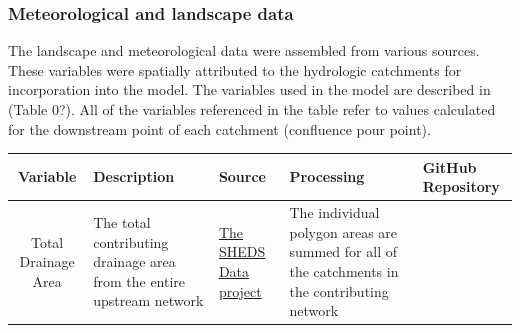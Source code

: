 \documentclass[]{article}
\begin{document}
\subsubsection{Meteorological and landscape
data}\label{meteorological-and-landscape-data}

The landscape and meteorological data were assembled from various
sources. These variables were spatially attributed to the hydrologic
catchments for incorporation into the model. The variables used in the
model are described in (Table 0?). All of the variables referenced in
the table refer to values calculated for the downstream point of each
catchment (confluence pour point).

\begin{longtable}[c]{@{}cllll@{}}
\toprule
\begin{minipage}[b]{0.10\columnwidth}\centering\strut
Variable
\strut\end{minipage} &
\begin{minipage}[b]{0.24\columnwidth}\raggedright\strut
Description
\strut\end{minipage} &
\begin{minipage}[b]{0.14\columnwidth}\raggedright\strut
Source
\strut\end{minipage} &
\begin{minipage}[b]{0.23\columnwidth}\raggedright\strut
Processing
\strut\end{minipage} &
\begin{minipage}[b]{0.16\columnwidth}\raggedright\strut
GitHub Repository
\strut\end{minipage}\tabularnewline
\midrule
\endhead
\begin{minipage}[t]{0.10\columnwidth}\centering\strut
Total Drainage Area
\strut\end{minipage} &
\begin{minipage}[t]{0.24\columnwidth}\raggedright\strut
The total contributing drainage area from the entire upstream network
\strut\end{minipage} &
\begin{minipage}[t]{0.14\columnwidth}\raggedright\strut
\href{http://conte-ecology.github.io/shedsData/}{The SHEDS Data project}
\strut\end{minipage} &
\begin{minipage}[t]{0.23\columnwidth}\raggedright\strut
The individual polygon areas are summed for all of the catchments in the
contributing network
\strut\end{minipage} &
\begin{minipage}[t]{0.16\columnwidth}\raggedright\strut

\end{minipage}
\end{longtable}
\end{document}
